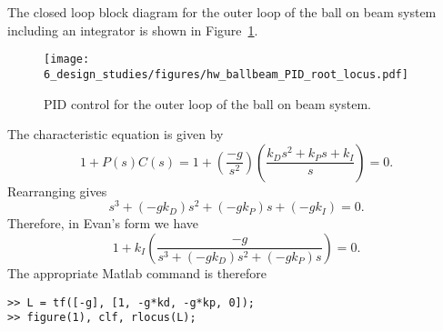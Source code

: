 
The closed loop block diagram for the outer loop of the ball on beam system including an integrator is shown in Figure~\ref{fig:hw_ballbeam_PID_root_locus}.  
\begin{figure}[htbp]
   \centering
   \texttt{[image: 6\_design\_studies/figures/hw\_ballbeam\_PID\_root\_locus.pdf]}
   \caption{PID control for the outer loop of the ball on beam system.}
   \label{fig:hw_ballbeam_PID_root_locus}
\end{figure}
The characteristic equation is given by
\[
1+P(s)C(s) = 1+\left(\frac{-g}{s^2}\right)\left(\frac{k_Ds^2+k_Ps+k_I}{s}\right) = 0.
\]
Rearranging gives
\[
s^3 + (-gk_D)s^2 + (-gk_P)s + (-gk_I) = 0.
\]
Therefore, in Evan's form we have
\[
1 + k_{I}\left(\frac{-g}{s^3 + (-gk_D)s^2 + (-gk_P)s}\right) = 0.
\]
The appropriate Matlab command is therefore
\begin{lstlisting}
>> L = tf([-g], [1, -g*kd, -g*kp, 0]);
>> figure(1), clf, rlocus(L);
\end{lstlisting}
